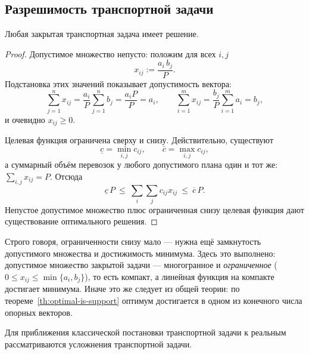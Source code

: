 \subsection{Разрешимость транспортной задачи}

\begin{theorem}\label{th:transport-solvable}
Любая закрытая транспортная задача имеет решение.
\end{theorem}

\begin{proof}
Допустимое множество непусто: положим для всех $i, j$
\[
  x_{ij} := \frac{a_i\, b_j}{P} .
\]
Подстановка этих значений показывает допустимость вектора:
\[
  \sum_{j=1}^{n} x_{ij} = \frac{a_i}{P} \sum_{j=1}^{n} b_j = \frac{a_i P}{P} = a_i ,
  \qquad
  \sum_{i=1}^{m} x_{ij} = \frac{b_j}{P} \sum_{i=1}^{m} a_i = b_j ,
\]
и очевидно $x_{ij} \ge 0$.

Целевая функция ограничена сверху и снизу. Действительно, существуют
\[
  \underline{c} = \min_{i,j} c_{ij} , \qquad \overline{c} = \max_{i,j} c_{ij} ,
\]
а суммарный объём перевозок у любого допустимого плана один и тот же:
$\sum_{i,j} x_{ij} = P$. Отсюда
\[
  \underline{c}\,P \ \le\ \sum_{i}\sum_{j} c_{ij} x_{ij} \ \le\ \overline{c}\,P .
\]
Непустое допустимое множество плюс ограниченная снизу целевая функция дают
существование оптимального решения.
\end{proof}

\begin{idea}
Строго говоря, ограниченности снизу мало — нужна ещё замкнутость допустимого
множества и достижимость минимума. Здесь это выполнено: допустимое множество
закрытой задачи — многогранное и \emph{ограниченное} ($0 \le x_{ij} \le \min\{a_i, b_j\}$),
то есть компакт, а линейная функция на компакте достигает минимума. Иначе это же
следует из общей теории: по теореме~\ref{th:optimal-is-support} оптимум достигается
в одном из конечного числа опорных векторов.
\end{idea}

Для приближения классической постановки транспортной задачи к реальным
рассматриваются усложнения транспортной задачи.
